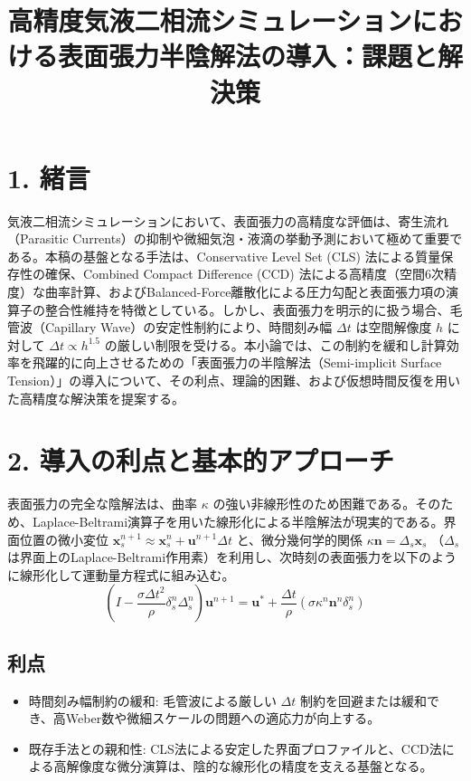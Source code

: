 \documentclass[12pt, a4paper, titlepage]{article}
\title{高精度気液二相流シミュレーションにおける表面張力半陰解法の導入：課題と解決策}
\author{}
\date{}
\begin{document}
\maketitle

\section*{1. 緒言}
気液二相流シミュレーションにおいて、表面張力の高精度な評価は、寄生流れ（Parasitic Currents）の抑制や微細気泡・液滴の挙動予測において極めて重要である。本稿の基盤となる手法は、Conservative Level Set (CLS) 法による質量保存性の確保、Combined Compact Difference (CCD) 法による高精度（空間6次精度）な曲率計算、およびBalanced-Force離散化による圧力勾配と表面張力項の演算子の整合性維持を特徴としている。しかし、表面張力を明示的に扱う場合、毛管波（Capillary Wave）の安定性制約により、時間刻み幅 $\Delta t$ は空間解像度 $h$ に対して $\Delta t \propto h^{1.5}$ の厳しい制限を受ける。本小論では、この制約を緩和し計算効率を飛躍的に向上させるための「表面張力の半陰解法（Semi-implicit Surface Tension）」の導入について、その利点、理論的困難、および仮想時間反復を用いた高精度な解決策を提案する。

\section*{2. 導入の利点と基本的アプローチ}
表面張力の完全な陰解法は、曲率 $\kappa$ の強い非線形性のため困難である。そのため、Laplace-Beltrami演算子を用いた線形化による半陰解法が現実的である。界面位置の微小変位 $\mathbf{x}_s^{n+1} \approx \mathbf{x}_s^n + \mathbf{u}^{n+1} \Delta t$ と、微分幾何学的関係 $\kappa \mathbf{n} = \Delta_s \mathbf{x}_s$ （$\Delta_s$ は界面上のLaplace-Beltrami作用素）を利用し、次時刻の表面張力を以下のように線形化して運動量方程式に組み込む。
$$(I - \frac{\sigma \Delta t^2}{\rho} \delta_s^n \Delta_s^n) \mathbf{u}^{n+1} = \mathbf{u}^* + \frac{\Delta t}{\rho} (\sigma \kappa^n \mathbf{n}^n \delta_s^n)$$
\subsection*{利点}
\begin{itemize}
    \item 時間刻み幅制約の緩和: 毛管波による厳しい $\Delta t$ 制約を回避または緩和でき、高Weber数や微細スケールの問題への適応力が向上する。
    \item 既存手法との親和性: CLS法による安定した界面プロファイルと、CCD法による高解像度な微分演算は、陰的な線形化の精度を支える基盤となる。
\end{itemize}
\end{document}
